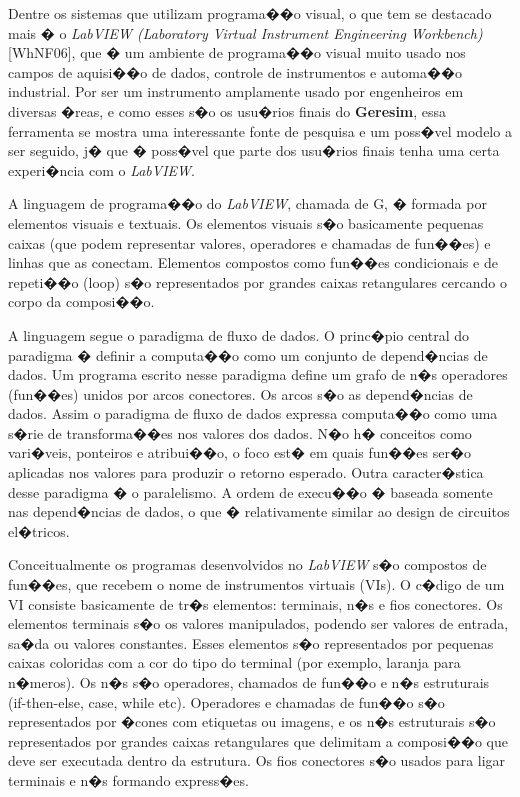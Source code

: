 \documentclass[dissertacao,modelo1,brazil]{ThesisPUC}
\begin{document}
Dentre os sistemas que utilizam programa��o visual, o que tem se destacado mais
� o \emph{LabVIEW (Laboratory Virtual Instrument Engineering Workbench)} [WhNF06], 
que � um ambiente de programa��o visual muito usado nos campos de aquisi��o de 
dados, controle de instrumentos e automa��o industrial. 
Por ser um instrumento amplamente usado por engenheiros em diversas �reas,
e como esses s�o os usu�rios finais do \textbf{Geresim}, essa ferramenta
se mostra uma interessante fonte de pesquisa e um poss�vel modelo a ser seguido, 
j� que � poss�vel que parte dos usu�rios finais tenha uma certa experi�ncia
com o \emph{LabVIEW}.

A linguagem de programa��o do \emph{LabVIEW}, chamada de G, � formada por elementos
visuais e textuais. Os elementos visuais s�o basicamente pequenas caixas (que 
podem representar valores, operadores e chamadas de fun��es) e linhas que as conectam. 
Elementos compostos como fun��es condicionais e de repeti��o (loop) s�o representados
por grandes caixas retangulares cercando o corpo da composi��o.

A linguagem segue o paradigma de fluxo de dados. O princ�pio central do paradigma
� definir a computa��o como um conjunto de depend�ncias de dados. Um programa 
escrito nesse paradigma define um grafo de n�s operadores (fun��es) unidos por 
arcos conectores. Os arcos s�o as depend�ncias de dados. Assim o paradigma de fluxo
de dados expressa computa��o como uma s�rie de transforma��es nos valores dos dados. 
N�o h� conceitos como vari�veis, ponteiros e atribui��o, o foco est� em quais fun��es 
ser�o aplicadas nos valores para produzir o retorno esperado. Outra caracter�stica 
desse paradigma � o paralelismo. A ordem de execu��o � baseada somente nas depend�ncias
de dados, o que � relativamente similar ao design de circuitos el�tricos.

Conceitualmente os programas desenvolvidos no \emph{LabVIEW} s�o compostos de fun��es,
que recebem o nome de instrumentos virtuais (VIs).
O c�digo de um VI consiste basicamente de tr�s elementos: terminais, n�s e fios conectores.
Os elementos terminais s�o os valores manipulados, podendo ser valores de entrada, sa�da ou
valores constantes. Esses elementos s�o representados por pequenas caixas coloridas com a 
cor do tipo do terminal (por exemplo, laranja para n�meros). Os n�s s�o operadores, chamados 
de fun��o e n�s estruturais (if-then-else, case, while etc). Operadores e chamadas de fun��o 
s�o representados por �cones com etiquetas ou imagens, e os n�s estruturais s�o representados 
por grandes caixas retangulares que delimitam a composi��o que deve ser executada dentro 
da estrutura. Os fios conectores s�o usados para ligar terminais e n�s formando express�es.
\end{document}
